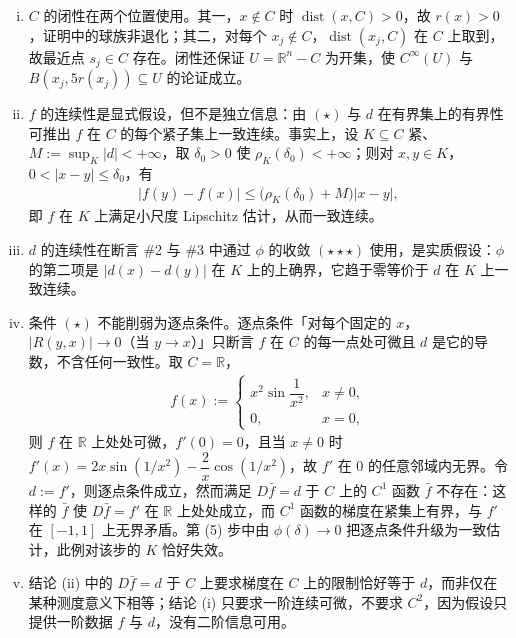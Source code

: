 \documentclass[../../main.tex]{subfiles}%
\begin{document}
\begin{remark}\label{remark:ch06-thm-6-10-条件}
\begin{enumerate}[(i)]
\item $C$ 的闭性在两个位置使用。其一，$x\notin C$ 时 $\operatorname{dist}(x,C)>0$，故 $r(x)>0$，证明中的球族非退化；其二，对每个 $x_j\notin C$，$\operatorname{dist}(x_j,C)$ 在 $C$ 上取到，故最近点 $s_j\in C$ 存在。闭性还保证 $U=\mathbb{R}^n-C$ 为开集，使 $C^{\infty}(U)$ 与 $B(x_j,5r(x_j))\subseteq U$ 的论证成立。
\item $f$ 的连续性是显式假设，但不是独立信息：由 $(\star)$ 与 $d$ 在有界集上的有界性可推出 $f$ 在 $C$ 的每个紧子集上一致连续。事实上，设 $K\subseteq C$ 紧、$M:=\sup_K\lvert d\rvert<+\infty$，取 $\delta_0>0$ 使 $\rho_K(\delta_0)<+\infty$；则对 $x,y\in K$，$0<\lvert x-y\rvert\leqslant\delta_0$，有
\begin{align*}
\lvert f(y)-f(x)\rvert\leqslant\bigl(\rho_K(\delta_0)+M\bigr)\lvert x-y\rvert,
\end{align*}
即 $f$ 在 $K$ 上满足小尺度 Lipschitz 估计，从而一致连续。
\item $d$ 的连续性在断言 \#2 与 \#3 中通过 $\phi$ 的收敛 $(\star\star\star)$ 使用，是实质假设：$\phi$ 的第二项是 $\lvert d(x)-d(y)\rvert$ 在 $K$ 上的上确界，它趋于零等价于 $d$ 在 $K$ 上一致连续。
\item 条件 $(\star)$ 不能削弱为逐点条件。逐点条件「对每个固定的 $x$，$\lvert R(y,x)\rvert\to0$（当 $y\to x$）」只断言 $f$ 在 $C$ 的每一点处可微且 $d$ 是它的导数，不含任何一致性。取 $C=\mathbb{R}$，
\begin{align*}
f(x):=
\begin{cases}
x^2\sin\dfrac{1}{x^2}, & x\neq0,\\
0, & x=0,
\end{cases}
\end{align*}
则 $f$ 在 $\mathbb{R}$ 上处处可微，$f'(0)=0$，且当 $x\neq0$ 时 $f'(x)=2x\sin(1/x^2)-\dfrac{2}{x}\cos(1/x^2)$，故 $f'$ 在 $0$ 的任意邻域内无界。令 $d:=f'$，则逐点条件成立，然而满足 $D\bar f=d$ 于 $C$ 上的 $C^1$ 函数 $\bar f$ 不存在：这样的 $\bar f$ 使 $D\bar f=f'$ 在 $\mathbb{R}$ 上处处成立，而 $C^1$ 函数的梯度在紧集上有界，与 $f'$ 在 $[-1,1]$ 上无界矛盾。第 (5) 步中由 $\phi(\delta)\to0$ 把逐点条件升级为一致估计，此例对该步的 $K$ 恰好失效。
\item 结论 (ii) 中的 $D\bar f=d$ 于 $C$ 上要求梯度在 $C$ 上的限制恰好等于 $d$，而非仅在某种测度意义下相等；结论 (i) 只要求一阶连续可微，不要求 $C^2$，因为假设只提供一阶数据 $f$ 与 $d$，没有二阶信息可用。
\end{enumerate}
\end{remark}
\end{document}
